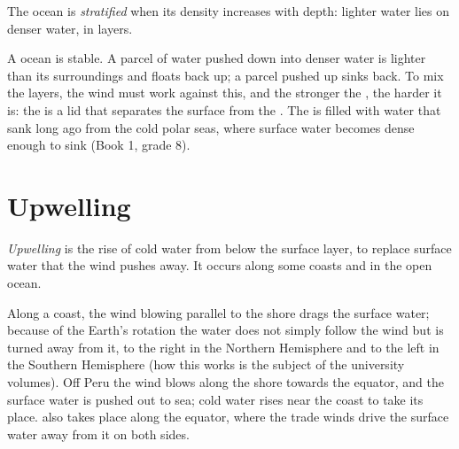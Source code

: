 \begin{definition}[Stratification]\label{def:g10:layered-ocean:stratification}
The ocean is \emph{stratified} when its density
increases with depth: lighter water lies on denser water, in layers.
\end{definition}

A  ocean is stable. A parcel of water pushed down into denser water
is lighter than its surroundings and floats back up; a parcel pushed up sinks
back. To mix the layers, the wind must work against this, and the stronger
the , the harder it is: the  is a lid that separates the
surface from the . The  is filled with water that sank
long ago from the cold polar seas, where surface water becomes dense enough
to sink (Book 1, grade 8).

\section{Upwelling}

\begin{definition}[Upwelling]\label{def:g10:layered-ocean:upwelling}
\emph{Upwelling} is the rise of cold water from below the
surface layer, to replace surface water that the wind pushes away. It occurs
along some coasts and in the open ocean.
\end{definition}

Along a coast, the wind blowing parallel to the shore drags the surface water;
because of the Earth's rotation the water does not simply follow the wind but
is turned away from it, to the right in the Northern Hemisphere and to the
left in the Southern Hemisphere (how this works is the subject of the
university volumes). Off Peru the wind blows along the shore towards the
equator, and the surface water is pushed out to sea; cold water rises near
the coast to take its place.  also takes place along the equator,
where the trade winds drive the surface water away from it on both sides.

